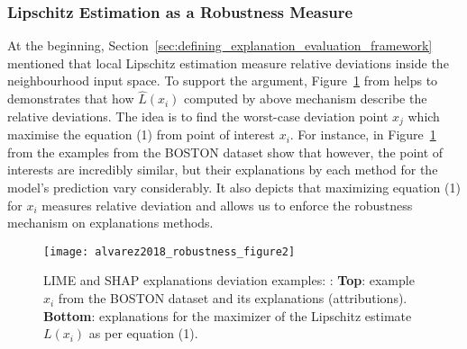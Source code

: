 \documentclass[english]{tktltiki2}
\theoremstyle{definition}
\theoremstyle{remark}
\begin{document}
\subsubsection{Lipschitz Estimation as a Robustness Measure}\label{sec:lipschitz_estimation_as_a_robustness_measure} %
At the beginning, Section~\ref{sec:defining_explanation_evaluation_framework} mentioned that local Lipschitz estimation measure relative deviations inside the neighbourhood input space. To support the argument, Figure~\ref{fig:alvarez2018_robustness_figure2} from \citep{alvarez2018robustness} helps to demonstrates that how $\hat{L}(x_i)$ computed by above mechanism describe the relative deviations. The idea is to find the worst-case deviation point $x_j$ which maximise the equation (1) from point of interest $x_i$. For instance, in Figure~\ref{fig:alvarez2018_robustness_figure2} from \citep{alvarez2018robustness} the examples from the BOSTON dataset show that however, the point of interests are incredibly similar, but their explanations by each method for the model’s prediction vary considerably. It also depicts that maximizing equation (1) for $x_i$ measures relative deviation and allows us to enforce the robustness mechanism on explanations methods.
\begin{figure}[H]
	\texttt{[image: alvarez2018\_robustness\_figure2]}
	\vspace*{-10mm}
	\caption{LIME and SHAP explanations deviation examples: \citep{alvarez2018robustness}: \textbf{Top}: example $x_i$ from the BOSTON dataset and its explanations (attributions). \textbf{Bottom}: explanations for the maximizer of the Lipschitz estimate $L(x_i)$ as per equation (1).}
	\label{fig:alvarez2018_robustness_figure2}
\end{figure}






\end{document}
